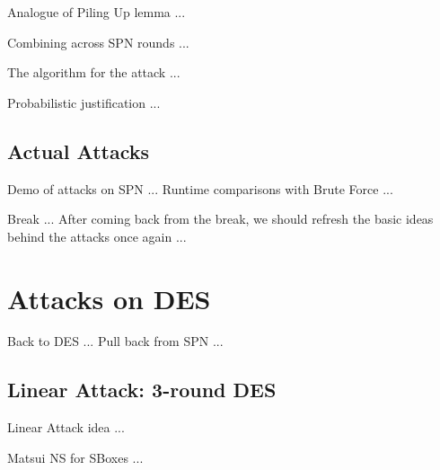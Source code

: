 \documentclass[9pt]{beamer}
\begin{document}
\begin{frame}
Analogue of Piling Up lemma ...

\end{frame}

\begin{frame}
Combining across SPN rounds ... 

\end{frame}

\begin{frame}
The algorithm for the attack ... 

\end{frame}

\begin{frame}
Probabilistic justification ...

\end{frame}

\subsection{Actual Attacks}
\begin{frame}
Demo of attacks on SPN ... Runtime comparisons with Brute Force ...

\end{frame}

\begin{frame}
Break ... After coming back from the break, we should refresh the basic ideas behind the attacks once again ...

\end{frame}


\section{Attacks on DES}
\begin{frame}
Back to DES ... Pull back from SPN ...

\end{frame}

\subsection{Linear Attack: 3-round DES}
\begin{frame}
Linear Attack idea ... 

\end{frame}

\begin{frame}
Matsui NS for SBoxes ...

\end{frame}
\end{document}
